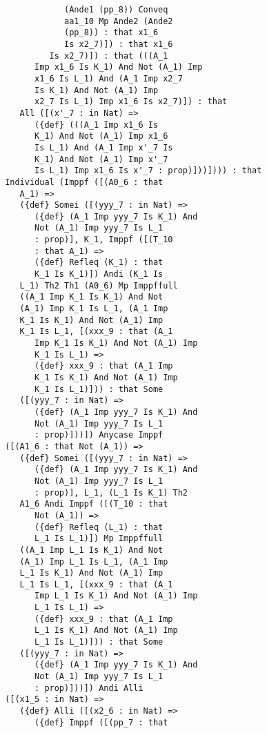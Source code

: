 \documentclass{article}
\begin{document}
\begin{verbatim}
                   (Ande1 (pp_8)) Conveq 
                   aa1_10 Mp Ande2 (Ande2 
                   (pp_8)) : that x1_6 
                   Is x2_7)]) : that x1_6 
                Is x2_7)]) : that (((A_1 
             Imp x1_6 Is K_1) And Not (A_1) Imp 
             x1_6 Is L_1) And (A_1 Imp x2_7 
             Is K_1) And Not (A_1) Imp 
             x2_7 Is L_1) Imp x1_6 Is x2_7)]) : that 
          All ([(x'_7 : in Nat) => 
             ({def} (((A_1 Imp x1_6 Is 
             K_1) And Not (A_1) Imp x1_6 
             Is L_1) And (A_1 Imp x'_7 Is 
             K_1) And Not (A_1) Imp x'_7 
             Is L_1) Imp x1_6 Is x'_7 : prop)]))]))) : that 
       Individual (Imppf ([(A0_6 : that 
          A_1) => 
          ({def} Somei ([(yyy_7 : in Nat) => 
             ({def} (A_1 Imp yyy_7 Is K_1) And 
             Not (A_1) Imp yyy_7 Is L_1 
             : prop)], K_1, Imppf ([(T_10 
             : that A_1) => 
             ({def} Refleq (K_1) : that 
             K_1 Is K_1)]) Andi (K_1 Is 
          L_1) Th2 Th1 (A0_6) Mp Imppffull 
          ((A_1 Imp K_1 Is K_1) And Not 
          (A_1) Imp K_1 Is L_1, (A_1 Imp 
          K_1 Is K_1) And Not (A_1) Imp 
          K_1 Is L_1, [(xxx_9 : that (A_1 
             Imp K_1 Is K_1) And Not (A_1) Imp 
             K_1 Is L_1) => 
             ({def} xxx_9 : that (A_1 Imp 
             K_1 Is K_1) And Not (A_1) Imp 
             K_1 Is L_1)])) : that Some 
          ([(yyy_7 : in Nat) => 
             ({def} (A_1 Imp yyy_7 Is K_1) And 
             Not (A_1) Imp yyy_7 Is L_1 
             : prop)]))]) Anycase Imppf 
       ([(A1_6 : that Not (A_1)) => 
          ({def} Somei ([(yyy_7 : in Nat) => 
             ({def} (A_1 Imp yyy_7 Is K_1) And 
             Not (A_1) Imp yyy_7 Is L_1 
             : prop)], L_1, (L_1 Is K_1) Th2 
          A1_6 Andi Imppf ([(T_10 : that 
             Not (A_1)) => 
             ({def} Refleq (L_1) : that 
             L_1 Is L_1)]) Mp Imppffull 
          ((A_1 Imp L_1 Is K_1) And Not 
          (A_1) Imp L_1 Is L_1, (A_1 Imp 
          L_1 Is K_1) And Not (A_1) Imp 
          L_1 Is L_1, [(xxx_9 : that (A_1 
             Imp L_1 Is K_1) And Not (A_1) Imp 
             L_1 Is L_1) => 
             ({def} xxx_9 : that (A_1 Imp 
             L_1 Is K_1) And Not (A_1) Imp 
             L_1 Is L_1)])) : that Some 
          ([(yyy_7 : in Nat) => 
             ({def} (A_1 Imp yyy_7 Is K_1) And 
             Not (A_1) Imp yyy_7 Is L_1 
             : prop)]))]) Andi Alli 
       ([(x1_5 : in Nat) => 
          ({def} Alli ([(x2_6 : in Nat) => 
             ({def} Imppf ([(pp_7 : that 

\end{verbatim}
\end{document}

